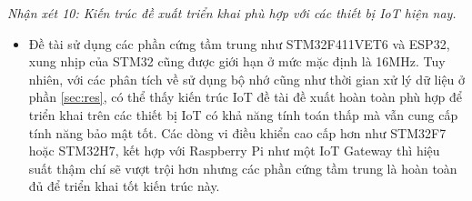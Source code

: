 \textit{Nhận xét 10: Kiến trúc đề xuất triển khai phù hợp với các thiết bị IoT hiện nay.}
\begin{itemize}
    \item Đề tài sử dụng các phần cứng tầm trung như STM32F411VET6 và ESP32, xung nhịp của STM32 cũng được giới hạn ở mức mặc  định là 16MHz. Tuy nhiên, với các phân tích về sử dụng bộ nhớ cũng như thời gian xử lý dữ liệu ở phần \ref{sec:res}, có thể thấy kiến trúc IoT đề tài đề xuất hoàn toàn phù hợp để triển khai trên các thiết bị IoT có khả năng tính toán thấp mà vẫn cung cấp tính năng bảo mật tốt. Các dòng vi điều khiển cao cấp hơn như STM32F7 hoặc STM32H7, kết hợp với Raspberry Pi như một IoT Gateway thì hiệu suất thậm chí sẽ vượt trội hơn nhưng các phần cứng tầm trung là hoàn toàn đủ để triển khai tốt kiến trúc này.
\end{itemize}


